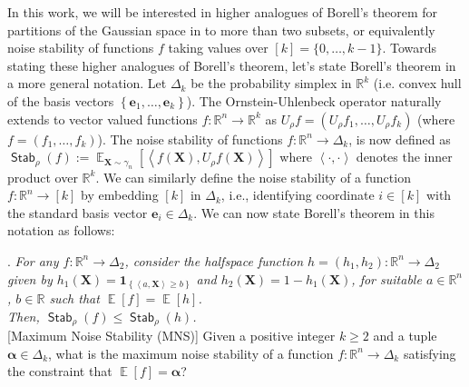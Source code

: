 \documentclass[11pt]{article}
\newcommand{\inbrace}[1]{\left \{ #1 \right \}}
\newcommand{\inangle}[1]{\left \langle #1 \right \rangle}
\newcommand{\set}[1]{\inbrace{#1}}
\DeclareMathOperator*{\Ex}{\mathbb{E}}
\DeclareMathOperator*{\Stab}{\mathsf{Stab}}
\newcommand{\indicator}{\mathbf{1}}
\newcommand{\bbR}{{\mathbb R}}
\newcommand{\be}{{\bm e}}
\newcommand{\bX}{\mathbf{X}}
\newcommand{\balpha}{{\boldsymbol \alpha}}
\begin{document}

In this work, we will be interested in higher analogues of Borell's theorem for partitions of the Gaussian space in to more than two subsets, or equivalently noise stability of functions $f$ taking values over $[k] = \{0,\ldots, k-1\}$.  
%
%
%
%
Towards stating these higher analogues of Borell's theorem, let's state Borell's theorem in a more general notation. Let $\Delta_k$ be the probability simplex in $\bbR^k$ (i.e. convex hull of the basis vectors $\set{\be_1, \ldots, \be_k}$). The Ornstein-Uhlenbeck operator naturally extends to vector valued functions $f : \bbR^n \to \bbR^k$ as $U_\rho f = (U_\rho f_1, \ldots, U_\rho f_k)$ (where $f = (f_1, \ldots, f_k)$). The noise stability of functions $f : \bbR^n \to \Delta_k$, is now defined as $\Stab_{\rho}(f) := \Ex_{\bX \sim \gamma_n}[\inangle{f(\bX), U_{\rho}f(\bX)}]$ where $\inangle{ \cdot, \cdot}$ denotes the inner product over $\mathbb{R}^k$. We can similarly define the noise stability of a function $f:\mathbb{R}^n \to [k]$ by embedding $[k]$ in $\Delta_k$, i.e., identifying coordinate $i \in [k]$ with the standard basis vector $\be_i \in \Delta_k$. We can now state Borell's theorem in this notation as follows:\\

\vspace*{-0.2cm}

 \cite{borell1985geometric}. {\em For any $f : \bbR^n \to \Delta_2$, consider the halfspace function $h = (h_1, h_2) : \bbR^n \to \Delta_2$ given by $h_1(\bX) = \indicator_{\set{\inangle{a, \bX} \ge b}}$ and $h_2(\bX) = 1 - h_1(\bX)$, for suitable $a \in \bbR^n$, $b \in \bbR$ such that $\Ex[f] = \Ex[h]$.\\ Then, $\Stab_\rho(f) \le \Stab_\rho(h)$.}\\


 [Maximum Noise Stability (MNS)] Given a positive integer $k \geq 2$ and a tuple $\balpha \in \Delta_k$, what is the maximum noise stability of a function $f:\bbR^n \to \Delta_k$ satisfying the constraint that $\Ex[f] = \balpha$?\\
\end{document}

